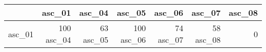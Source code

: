 \begin{tabular}{lrrrrrr}
\toprule
 & asc_01 & asc_04 & asc_05 & asc_06 & asc_07 & asc_08 \\
\midrule
asc_01 & 100%
asc_04 & 63%
asc_05 & 100%
asc_06 & 74%
asc_07 & 58%
asc_08 & 0%
\bottomrule
\end{tabular}
